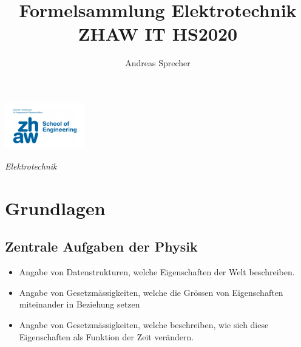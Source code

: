 \documentclass[8pt,a4paper]{scrartcl}
\title{Formelsammlung Elektrotechnik ZHAW IT HS2020}
\author{Andreas Sprecher}
\begin{document}
\begin{multicols*}{3}
\setlength{\columnseprule}{0.4pt}
    \parbox{4cm}{
        \includegraphics[height=2cm]{./img/Logo.jpeg}
    }
    \parbox{4cm}{
        \emph{\Large{Elektrotechnik}}
    }
    \vspace{-2mm} 

    \section{Grundlagen}
		\subsection{Zentrale Aufgaben der Physik}    
    			\begin{itemize}\itemsep0pt				
				\item Angabe von Datenstrukturen, welche Eigenschaften der Welt beschreiben.
				\item Angabe von Gesetzmässigkeiten, welche die Grössen von Eigenschaften miteinander in Beziehung setzen
				\item Angabe von Gesetzmässigkeiten, welche beschreiben, wie sich diese Eigenschaften als Funktion der Zeit verändern.
			\end{itemize}
    

\end{multicols*}
\end{document}
